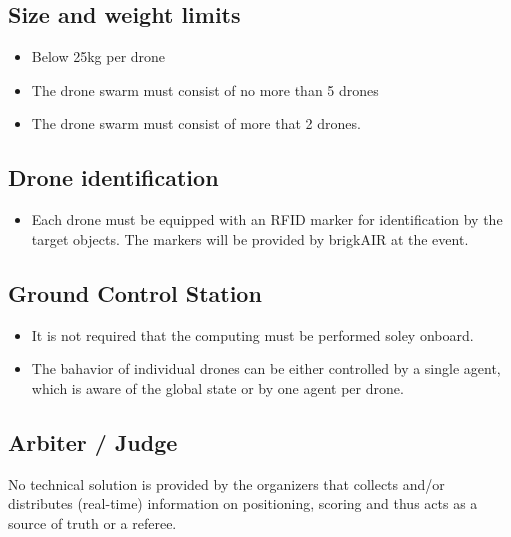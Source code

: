 \subsection{Size and weight limits}
\begin{itemize}
	\item{Below 25kg per drone}
	\item The drone swarm must consist of no more than 5 drones
	\item The drone swarm must consist of more that 2 drones.
\end{itemize}

\subsection{Drone identification}
\begin{itemize}
	\item Each drone must be equipped with an RFID marker for identification by the target objects. The markers will be provided by brigkAIR at the event.
\end{itemize}

\subsection{Ground Control Station}
\begin{itemize}
	\item It is not required that the computing must be performed soley onboard.
	\item The bahavior of individual drones can be either controlled by a single agent, which is aware of the global state or by one agent per drone.
\end{itemize}

\subsection{Arbiter / Judge}
No technical solution is provided by the organizers that collects and/or distributes (real-time) information on positioning, scoring and thus acts as a source of truth or a referee.